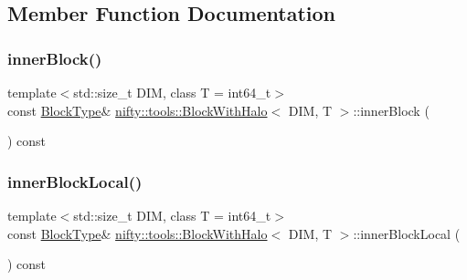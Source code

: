 \subsection{Member Function Documentation}
\mbox{\label{classnifty_1_1tools_1_1BlockWithHalo_af5e819b206d1c12dd3dfd57120306dd0}} 
\subsubsection{\texorpdfstring{inner\+Block()}{innerBlock()}}
{\footnotesize\ttfamily template$<$std\+::size\+\_\+t D\+IM, class T  = int64\+\_\+t$>$ \\
const \hyperlink{classnifty_1_1tools_1_1BlockWithHalo_a98d2c04518f8902ab6d985feba605987}{Block\+Type}\& \hyperlink{classnifty_1_1tools_1_1BlockWithHalo}{nifty\+::tools\+::\+Block\+With\+Halo}$<$ D\+IM, T $>$\+::inner\+Block (\begin{DoxyParamCaption}{ }\end{DoxyParamCaption}) const\hspace{0.3cm}{\ttfamily [inline]}}

\mbox{\label{classnifty_1_1tools_1_1BlockWithHalo_a44a2f5e1384cbf09fd29810c4868de0b}} 
\subsubsection{\texorpdfstring{inner\+Block\+Local()}{innerBlockLocal()}}
{\footnotesize\ttfamily template$<$std\+::size\+\_\+t D\+IM, class T  = int64\+\_\+t$>$ \\
const \hyperlink{classnifty_1_1tools_1_1BlockWithHalo_a98d2c04518f8902ab6d985feba605987}{Block\+Type}\& \hyperlink{classnifty_1_1tools_1_1BlockWithHalo}{nifty\+::tools\+::\+Block\+With\+Halo}$<$ D\+IM, T $>$\+::inner\+Block\+Local (\begin{DoxyParamCaption}{ }\end{DoxyParamCaption}) const\hspace{0.3cm}{\ttfamily [inline]}}


